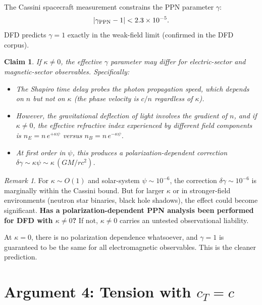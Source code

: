 \documentclass[12pt,a4paper]{article}
\newtheorem{claim}{Claim}
\theoremstyle{definition}
\theoremstyle{remark}
\newtheorem{remark}{Remark}
\begin{document}
The Cassini spacecraft measurement constrains the PPN parameter $\gamma$:
\begin{equation}
|\gamma_{\rm PPN} - 1| < 2.3 \times 10^{-5}.
\end{equation}
DFD predicts $\gamma = 1$ exactly in the weak-field limit (confirmed
in the DFD corpus).

\begin{claim}
If $\kappa \neq 0$, the effective $\gamma$ parameter may differ for
electric-sector and magnetic-sector observables.  Specifically:
\begin{itemize}
\item The Shapiro time delay probes the photon propagation speed, which
  depends on $n$ but not on $\kappa$ (the phase velocity is $c/n$
  regardless of $\kappa$).
\item However, the gravitational deflection of light involves the
  \emph{gradient} of $n$, and if $\kappa \neq 0$, the effective
  refractive index experienced by different field components is
  $n_E = n\, e^{+\kappa\psi}$ versus $n_B = n\, e^{-\kappa\psi}$.
\item At first order in $\psi$, this produces a polarization-dependent
  correction $\delta\gamma \sim \kappa\psi \sim \kappa\,(GM/rc^2)$.
\end{itemize}
\end{claim}

\begin{remark}
For $\kappa \sim O(1)$ and solar-system $\psi \sim 10^{-6}$, the
correction $\delta\gamma \sim 10^{-6}$ is marginally within the Cassini
bound.  But for larger $\kappa$ or in stronger-field environments (neutron
star binaries, black hole shadows), the effect could become significant.
\textbf{Has a polarization-dependent PPN analysis been performed for DFD
with $\kappa \neq 0$?}  If not, $\kappa \neq 0$ carries an untested
observational liability.
\end{remark}

At $\kappa = 0$, there is no polarization dependence whatsoever, and
$\gamma = 1$ is guaranteed to be the same for all electromagnetic
observables.  This is the cleaner prediction.

\section{Argument 4: Tension with $c_T = c$}
\label{sec:tensor-speed}
\end{document}
